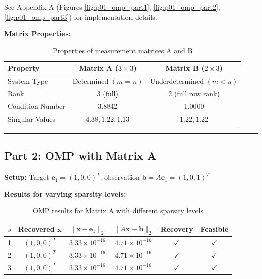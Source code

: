 See Appendix A (Figures \ref{fig:p01_omp_part1}, \ref{fig:p01_omp_part2}, \ref{fig:p01_omp_part3}) for implementation details.

\vspace{1em}

\textbf{Matrix Properties:}

\begin{table}[h]
\centering
\begin{tabular}{lcc}
\toprule
Property & Matrix A ($3 \times 3$) & Matrix B ($2 \times 3$) \\
\midrule
System Type & Determined $(m=n)$ & Underdetermined $(m<n)$ \\
Rank & 3 (full) & 2 (full row rank) \\
Condition Number & 3.8842 & 1.0000 \\
Singular Values & $4.38, 1.22, 1.13$ & $1.22, 1.22$ \\
\bottomrule
\end{tabular}
\caption{Properties of measurement matrices A and B}
\end{table}

\vspace{2em}
\noindent\rule{\textwidth}{0.4pt}

\clearpage
\subsection*{Part 2: OMP with Matrix A}

\textbf{Setup:} Target $\mathbf{e}_1 = (1, 0, 0)^T$, observation $\mathbf{b} = A\mathbf{e}_1 = (1, 0, 1)^T$

\textbf{Results for varying sparsity levels:}

\begin{table}[h]
\centering
\begin{tabular}{cccccc}
\toprule
$s$ & Recovered $\mathbf{x}$ & $\|\mathbf{x} - \mathbf{e}_1\|_2$ & $\|A\mathbf{x} - \mathbf{b}\|_2$ & Recovery & Feasible \\
\midrule
1 & $(1, 0, 0)^T$ & $3.33 \times 10^{-16}$ & $4.71 \times 10^{-16}$ & $\checkmark$ & $\checkmark$ \\
2 & $(1, 0, 0)^T$ & $3.33 \times 10^{-16}$ & $4.71 \times 10^{-16}$ & $\checkmark$ & $\checkmark$ \\
3 & $(1, 0, 0)^T$ & $3.33 \times 10^{-16}$ & $4.71 \times 10^{-16}$ & $\checkmark$ & $\checkmark$ \\
\bottomrule
\end{tabular}
\caption{OMP results for Matrix A with different sparsity levels}
\end{table}

